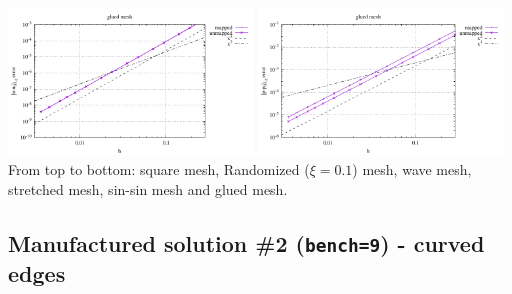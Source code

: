 \begin{center}
\includegraphics[width=6.5cm]{python_codes/fieldstone_76/results/bench9/straight/errors_V_mt6.pdf}
\includegraphics[width=6.5cm]{python_codes/fieldstone_76/results/bench9/straight/errors_P_mt6.pdf}\\
{\captionfont From top to bottom: square mesh, Randomized ($\xi=0.1$) mesh,
wave mesh, stretched mesh, sin-sin mesh and glued mesh.}
\end{center}

\newpage
\subsection*{Manufactured solution \#2 ({\tt bench=9}) - curved edges}

